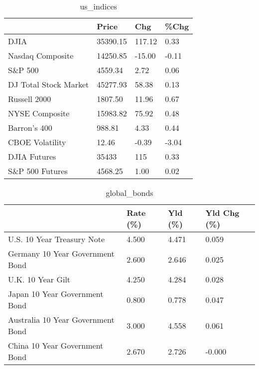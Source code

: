 \documentclass{article}%
\begin{document}
%


\begin{table}[htbp]%
\caption{us\_indices}%
\centering%
\begin{adjustbox}{width=1\textwidth}%
\begin{tabular}{llll}
\toprule
                      &    Price &    Chg &  \%Chg \\
\midrule
                 DJIA & 35390.15 & 117.12 &  0.33 \\
     Nasdaq Composite & 14250.85 & -15.00 & -0.11 \\
              S\&P 500 &  4559.34 &   2.72 &  0.06 \\
DJ Total Stock Market & 45277.93 &  58.38 &  0.13 \\
         Russell 2000 &  1807.50 &  11.96 &  0.67 \\
       NYSE Composite & 15983.82 &  75.92 &  0.48 \\
         Barron's 400 &   988.81 &   4.33 &  0.44 \\
      CBOE Volatility &    12.46 &  -0.39 & -3.04 \\
         DJIA Futures &    35433 &    115 &  0.33 \\
      S\&P 500 Futures &  4568.25 &   1.00 &  0.02 \\
\bottomrule
\end{tabular}
%
\end{adjustbox}%
\end{table}

%


\begin{table}[htbp]%
\caption{global\_bonds}%
\centering%
\begin{adjustbox}{width=1\textwidth}%
\begin{tabular}{llll}
\toprule
                                  & Rate (\%) & Yld (\%) & Yld Chg (\%) \\
\midrule
       U.S. 10 Year Treasury Note &    4.500 &   4.471 &       0.059 \\
  Germany 10 Year Government Bond &    2.600 &   2.646 &       0.025 \\
                U.K. 10 Year Gilt &    4.250 &   4.284 &       0.028 \\
    Japan 10 Year Government Bond &    0.800 &   0.778 &       0.047 \\
Australia 10 Year Government Bond &    3.000 &   4.558 &       0.061 \\
    China 10 Year Government Bond &    2.670 &   2.726 &      -0.000 \\
\bottomrule
\end{tabular}
%
\end{adjustbox}%
\end{table}
\end{document}
